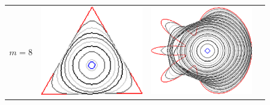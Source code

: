 {\begin{figure}
\begin{tabular}{p{3em}ccc}
$m=8$ & \includegraphics[scale=0.25]{figures/chapter6/level-effect/triangle/improve/len_pen0/radius-9/level8/summary.pdf} &
\includegraphics[scale=0.25]{figures/chapter6/level-effect/flower/improve/len_pen0/radius-9/level8/summary.pdf} &

\end{tabular}
\end{figure}}
